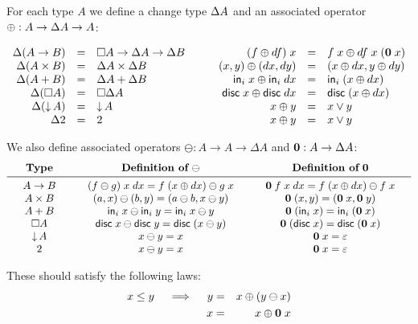 \documentclass{article}
\begin{document}
For each type $A$ we define a change type $\Delta A$ and an associated operator
$\oplus : A \to \Delta A \to A$:

\[\begin{array}{rcl>{\quad\quad}rcl}
  \GD(A \to B) &=& \Disc{A} \to \Delta A \to \Delta B
  & (f \oplus df)\; x &=& f\; x \oplus df\; x\; (\mb{0}\; x)\\
  \GD(A \x B) &=& \GD A \x \GD B
  & (x,y) \oplus (dx,dy) &=& (x \oplus dx, y \oplus dy)\\
  \GD(A + B) &=& \GD A + \GD B
  & \inj{i}{x} \oplus \inj{i}{dx} &=& \inj{i}{(x \oplus dx)}\\
  \GD(\Disc{A}) &=& \Disc{\GD A}
  & \disc{x} \oplus \disc{dx} &=& \disc{(x \oplus dx)}\\
  \GD(\Down{A}) &=& \Down{A} & x \oplus y &=& x \vee y\\
  \GD 2 &=& 2 & x \oplus y &=& x \vee y
\end{array}\]

We also define associated operators $\ominus : A \to A \to \Delta A$ and $\mathbf{0}
: A \to \Delta A$:
\[\arraycolsep=1.5em
\begin{array}{ccc}
  \textbf{Type}
  & {\textbf{Definition of}~\ominus}
  & {\textbf{Definition of}~\mb{0}}
  \\ \midrule
  A \to B
  & (f \ominus g)\; x \;dx = f\; (x \oplus dx) \ominus g \; x
  & \mb{0}\; f\; x\; dx = f\; (x \oplus dx) \ominus f\; x
  \\
  A \x B
  & (a,x) \ominus (b,y) = (a \ominus b, x \ominus y)
  & \mb{0} \; (x,y) = (\mb{0}\; x, \mb{0}\; y)
  \\
  A + B
  & \inj{i}{x} \ominus \inj{i}{y} = \inj{i}{x \ominus y}
  & \mb{0}\; (\inj{i}{x}) = \inj{i}{(\mb{0}\;x)}
  \\
  \Disc{A}
  & \disc{x} \ominus \disc{y} = \disc{(x \ominus y)}
  & \mb{0}\; (\disc{x}) = \disc{(\mb{0}\; x)}
  \\
  \Down{A}
  & x \ominus y = x
  & \mb{0}\; x = \unit
  \\
  2
  & x \ominus y = x
  & \mb{0}\; x = \unit
\end{array}
\]

These should satisfy the following laws:
\begin{eqnarray}
  x \le y \quad\implies\quad
  y &=& x \oplus (y \ominus x)\\
  x &=& x \oplus \mathbf{0}\; x
\end{eqnarray}
\end{document}
